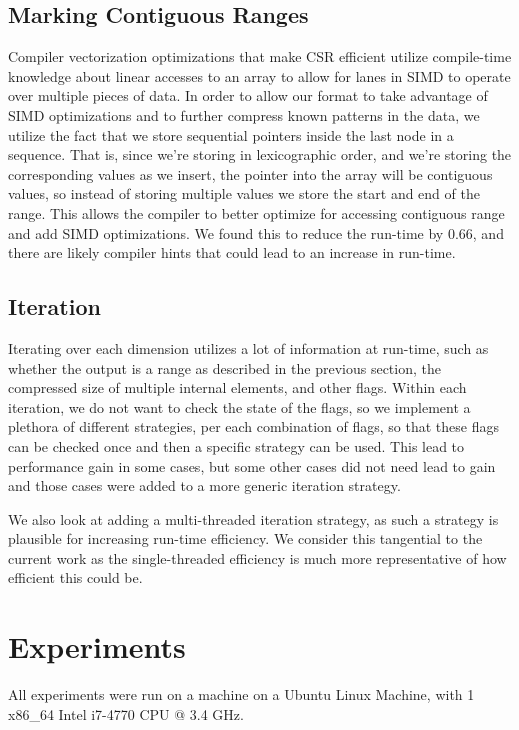 \documentclass[12pt]{article}
\begin{document}
\subsection{Marking Contiguous Ranges}
Compiler vectorization optimizations that make CSR efficient utilize compile-time knowledge
about linear accesses to an array to allow for lanes in SIMD to operate over multiple pieces of
data. In order to allow our format to take advantage of SIMD optimizations and to further
compress known patterns in the data, we utilize the fact that  we store sequential pointers
inside the last node in a sequence. That is, since we're storing in lexicographic order, and we're
storing the corresponding values as we insert, the pointer into the array will be contiguous
values, so instead of storing multiple values we store the start and end of the range.
This allows the compiler to better optimize for accessing contiguous range and add SIMD
optimizations. We found this to reduce the run-time by $0.66$, and there are likely compiler
hints that could lead to an increase in run-time.

\subsection{Iteration}
Iterating over each dimension utilizes a lot of information at run-time, such as whether the
output is a range as described in the previous section, the compressed size of multiple internal
elements, and other flags. Within each iteration, we do not want to check the state of the
flags, so we implement a plethora of different strategies, per each combination of flags, so
that these flags can be checked once and then a specific strategy can be used. This lead to
performance gain in some cases, but some other cases did not need lead to gain and those cases
were added to a more generic iteration strategy.

We also look at adding a multi-threaded iteration strategy, as such a strategy is plausible for
increasing run-time efficiency. We consider this tangential to the current work as the
single-threaded efficiency is much more representative of how efficient this could be.

\section{Experiments}

All experiments were run on a machine on a Ubuntu Linux Machine, with 1 x86\_64 Intel
i7-4770 CPU @ 3.4 GHz.
\end{document}
